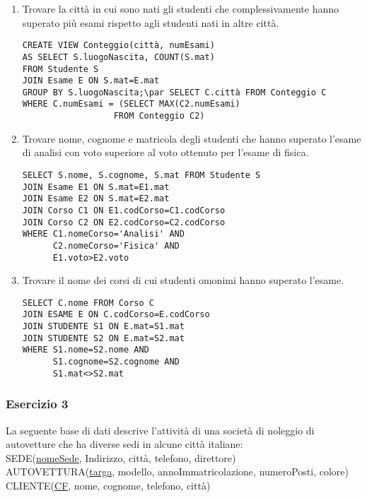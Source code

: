 \documentclass[a4paper]{article}
\begin{document}
\begin{enumerate}
\item Trovare la città in cui sono nati gli studenti che complessivamente hanno superato più esami rispetto agli studenti nati in altre città.
\begin{verbatim}
CREATE VIEW Conteggio(città, numEsami)
AS SELECT S.luogoNascita, COUNT(S.mat)
FROM Studente S
JOIN Esame E ON S.mat=E.mat
GROUP BY S.luogoNascita;\par SELECT C.città FROM Conteggio C
WHERE C.numEsami = (SELECT MAX(C2.numEsami)
                  FROM Conteggio C2)
\end{verbatim}
\item Trovare nome, cognome e matricola degli studenti che hanno superato l'esame di analisi con voto superiore al voto ottenuto per l'esame di fisica.
\begin{verbatim}
SELECT S.nome, S.cognome, S.mat FROM Studente S
JOIN Esame E1 ON S.mat=E1.mat
JOIN Esame E2 ON S.mat=E2.mat
JOIN Corso C1 ON E1.codCorso=C1.codCorso
JOIN Corso C2 ON E2.codCorso=C2.codCorso
WHERE C1.nomeCorso='Analisi' AND
      C2.nomeCorso='Fisica' AND
      E1.voto>E2.voto
\end{verbatim}
\item Trovare il nome dei corsi di cui studenti omonimi hanno superato l'esame.
\begin{verbatim}
SELECT C.nome FROM Corso C
JOIN ESAME E ON C.codCorso=E.codCorso
JOIN STUDENTE S1 ON E.mat=S1.mat
JOIN STUDENTE S2 ON E.mat=S2.mat
WHERE S1.nome=S2.nome AND
      S1.cognome=S2.cognome AND
      S1.mat<>S2.mat
\end{verbatim}
\end{enumerate}\par \subsubsection{Esercizio 3}
La seguente base di dati descrive l'attività di una società di noleggio di autovetture che ha diverse sedi in alcune città italiane:\medskip\\
SEDE(\underline{nomeSede}, Indirizzo, città, telefono, direttore)\\
AUTOVETTURA(\underline{targa}, modello, annoImmatricolazione, numeroPosti, colore)\\
CLIENTE(\underline{CF}, nome, cognome, telefono, città)\\
\end{document}
